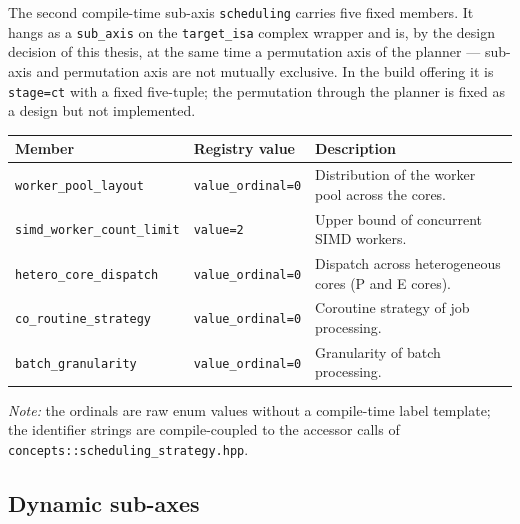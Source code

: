 The second compile-time sub-axis \texttt{scheduling} carries five fixed members. It hangs as a \texttt{sub\_\allowbreak{}axis} on the \texttt{target\_\allowbreak{}isa} complex wrapper and is, by the design decision of this thesis, at the same time a permutation axis of the planner --- sub-axis and permutation axis are not mutually exclusive. In the build offering it is \texttt{stage=ct} with a fixed five-tuple; the permutation through the planner is fixed as a design but not implemented.

\begin{scriptsize}
\begin{longtable}{@{}>{\raggedright\arraybackslash}p{4.0cm} >{\raggedright\arraybackslash}p{2.4cm} >{\raggedright\arraybackslash}p{7.1cm}@{}}
\toprule
Member & Registry value & Description \\
\midrule
\endhead%
\texttt{worker\_\allowbreak{}pool\_\allowbreak{}layout} & \texttt{value\_\allowbreak{}ordinal=0} & Distribution of the worker pool across the cores. \\
\texttt{simd\_\allowbreak{}worker\_\allowbreak{}count\_\allowbreak{}limit} & \texttt{value=2} & Upper bound of concurrent SIMD workers. \\
\texttt{hetero\_\allowbreak{}core\_\allowbreak{}dispatch} & \texttt{value\_\allowbreak{}ordinal=0} & Dispatch across heterogeneous cores (P and E cores). \\
\texttt{co\_\allowbreak{}routine\_\allowbreak{}strategy} & \texttt{value\_\allowbreak{}ordinal=0} & Coroutine strategy of job processing. \\
\texttt{batch\_\allowbreak{}granularity} & \texttt{value\_\allowbreak{}ordinal=0} & Granularity of batch processing. \\
\bottomrule
\end{longtable}
\end{scriptsize}

\emph{Note:} the ordinals are raw enum values without a compile-time label template; the identifier strings are compile-coupled to the accessor calls of \texttt{concepts::\allowbreak{}scheduling\_\allowbreak{}strategy.hpp}.

\subsection*{Dynamic sub-axes}

